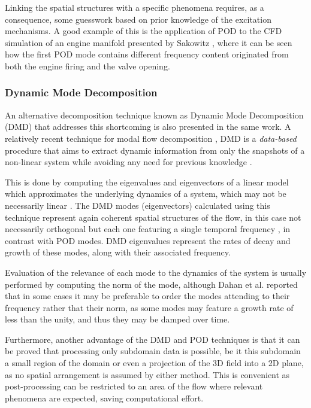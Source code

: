 Linking the spatial structures with a specific phenomena requires, as a consequence, some guesswork based on prior knowledge of the excitation mechanisms. A good example of this is the application of POD to the CFD simulation of an engine manifold presented by Sakowitz \cite{sakowitz2014flow}, where it can be seen how the first POD mode contains different frequency content originated from both the engine firing and the valve opening.

\subsubsection{Dynamic Mode Decomposition}

An alternative decomposition technique known as Dynamic Mode Decomposition (DMD) that addresses this shortcoming is also presented in the same work. A relatively recent technique for modal flow decomposition \cite{rowley2009spectral,schmid2010dynamic,chen2012variants}, DMD is a \textit{data-based} procedure that aims to extract dynamic information from only the snapshots of a non-linear system while avoiding any need for previous knowledge \cite{schmid2010dynamic}. 

This is done by computing the eigenvalues and eigenvectors of a linear model which approximates the underlying dynamics of a system, which may not be necessarily linear \cite{chen2012variants}. The DMD modes (eigenvectors) calculated using this technique represent again coherent spatial structures of the flow, in this case not necessarily orthogonal but each one featuring a single temporal frequency \cite{jovanovic2014sparsity}, in contrast with POD modes. DMD eigenvalues represent the rates of decay and growth of these modes, along with their associated frequency.

Evaluation of the relevance of each mode to the dynamics of the system is usually performed by computing the norm of the mode, although Dahan et al. reported \cite{dahan2014aero} that in some cases it may be preferable to order the modes attending to their frequency rather that their norm, as some modes may feature a growth rate of less than the unity, and thus they may be damped over time.

Furthermore, another advantage of the DMD and POD techniques is that it can be proved \cite{schmid2010dynamic,schmid2011applications} that processing only subdomain data is possible, be it this subdomain a small region of the domain or even a projection of the 3D field into a 2D plane, as no spatial arrangement is assumed by either method. This is convenient as post-processing can be restricted to an area of the flow where relevant phenomena are expected, saving computational effort.

